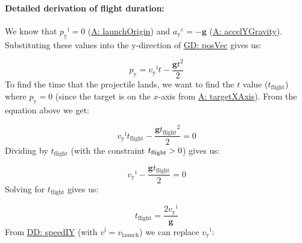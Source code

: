 \documentclass[12pt]{article}
\newcommand{\gt}{\ensuremath >}
\begin{document}
\paragraph{Detailed derivation of flight duration:}
\label{IM:calOfLandingTimeDeriv}
We know that ${{p_{\text{y}}}^{\text{i}}}=0$ (\hyperref[launchOrigin]{A: launchOrigin}) and ${{a_{\text{y}}}^{\text{c}}}=-\mathbf{g}$ (\hyperref[accelYGravity]{A: accelYGravity}). Substituting these values into the y-direction of \hyperref[GD:posVec]{GD: posVec} gives us:

\begin{displaymath}
{p_{\text{y}}}={{v_{\text{y}}}^{\text{i}}} t-\frac{\mathbf{g} t^{2}}{2}
\end{displaymath}
To find the time that the projectile lands, we want to find the $t$ value (${t_{\text{flight}}}$) where ${p_{\text{y}}}=0$ (since the target is on the $x$-axis from \hyperref[targetXAxis]{A: targetXAxis}). From the equation above we get:

\begin{displaymath}
{{v_{\text{y}}}^{\text{i}}} {t_{\text{flight}}}-\frac{\mathbf{g} {t_{\text{flight}}}^{2}}{2}=0
\end{displaymath}
Dividing by ${t_{\text{flight}}}$ (with the constraint ${t_{\text{flight}}}\gt{}0$) gives us:

\begin{displaymath}
{{v_{\text{y}}}^{\text{i}}}-\frac{\mathbf{g} {t_{\text{flight}}}}{2}=0
\end{displaymath}
Solving for ${t_{\text{flight}}}$ gives us:

\begin{displaymath}
{t_{\text{flight}}}=\frac{2 {{v_{\text{y}}}^{\text{i}}}}{\mathbf{g}}
\end{displaymath}
From \hyperref[DD:speedIY]{DD: speedIY} (with ${v^{\text{i}}}={v_{\text{launch}}}$) we can replace ${{v_{\text{y}}}^{\text{i}}}$:
\end{document}
